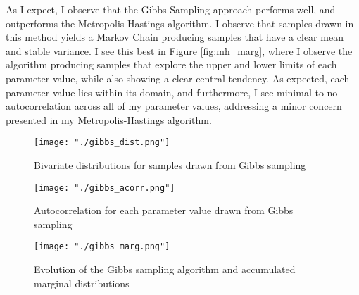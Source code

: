 \documentclass{article}
\begin{document}
As I expect, I observe that the Gibbs Sampling approach performs well, and outperforms the Metropolis Hastings algorithm. I observe that samples drawn in this method yields a Markov Chain producing samples that have a clear mean and stable variance. I see this best in Figure \ref{fig:mh_marg}, where I observe the algorithm producing samples that explore the upper and lower limits of each parameter value, while also showing a clear central tendency. As expected, each parameter value lies within its domain, and furthermore, I see minimal-to-no autocorrelation across all of my parameter values, addressing a minor concern presented in my Metropolis-Hastings algorithm.

\begin{figure}[H]
  \centering
  \texttt{[image: "./gibbs\_dist.png"]}
  \caption{\label{fig:gibbs_dist} Bivariate distributions for samples drawn from Gibbs sampling}
\end{figure}

\begin{figure}[H]
  \centering
  \texttt{[image: "./gibbs\_acorr.png"]}
  \caption{\label{fig:gibbs_acorr} Autocorrelation for each parameter value drawn from Gibbs sampling}
\end{figure}

\begin{figure}[H]
  \centering
  \texttt{[image: "./gibbs\_marg.png"]}
  \caption{\label{fig:gibbs_marg} Evolution of the Gibbs sampling algorithm and accumulated marginal distributions}
\end{figure}
\end{document}
